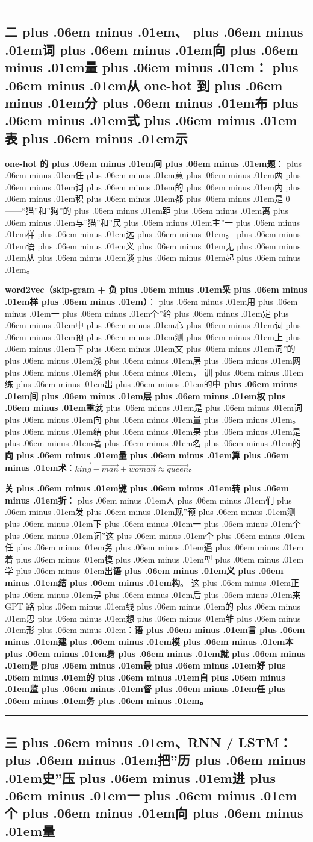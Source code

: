 \documentclass[
]{article}
\def\zh#1{{\zhfont #1}}
\def\zhglue{\hskip0pt plus .06em minus .01em}
\begin{document}
\begin{center}\rule{0.5\linewidth}{0.5pt}\end{center}

\subsection{\zh{二\zhglue 、\zhglue 词\zhglue 向\zhglue 量\zhglue ：\zhglue 从} one-hot \zh{到\zhglue 分\zhglue 布\zhglue 式\zhglue 表\zhglue 示}}\label{ux4e8cux8bcdux5411ux91cfux4ece-one-hot-ux5230ux5206ux5e03ux5f0fux8868ux793a}

\textbf{one-hot \zh{的\zhglue 问\zhglue 题}}\zh{：\zhglue 任\zhglue 意\zhglue 两\zhglue 词\zhglue 的\zhglue 内\zhglue 积\zhglue 都\zhglue 是} 0------``\zh{猫}''\zh{和}''\zh{狗}''\zh{的\zhglue 距\zhglue 离\zhglue 与}''\zh{猫}''\zh{和}''\zh{民\zhglue 主}''\zh{一\zhglue 样\zhglue 远\zhglue 。\zhglue 语\zhglue 义\zhglue 无\zhglue 从\zhglue 谈\zhglue 起\zhglue 。}

\textbf{word2vec\zh{（}skip-gram + \zh{负\zhglue 采\zhglue 样\zhglue ）}}\zh{：\zhglue 用\zhglue 一\zhglue 个}''\zh{给\zhglue 定\zhglue 中\zhglue 心\zhglue 词\zhglue 预\zhglue 测\zhglue 上\zhglue 下\zhglue 文\zhglue 词}''\zh{的\zhglue 浅\zhglue 层\zhglue 网\zhglue 络\zhglue ，} \zh{训\zhglue 练\zhglue 出\zhglue 的}\textbf{\zh{中\zhglue 间\zhglue 层\zhglue 权\zhglue 重}}\zh{就\zhglue 是\zhglue 词\zhglue 向\zhglue 量\zhglue 。\zhglue 结\zhglue 果\zhglue 是\zhglue 著\zhglue 名\zhglue 的}\textbf{\zh{向\zhglue 量\zhglue 算\zhglue 术}}\zh{：}\(\vec{king}-\vec{man}+\vec{woman}\approx\vec{queen}\)\zh{。}

\textbf{\zh{关\zhglue 键\zhglue 转\zhglue 折}}\zh{：\zhglue 人\zhglue 们\zhglue 发\zhglue 现}''\zh{预\zhglue 测\zhglue 下\zhglue 一\zhglue 个\zhglue 词}''\zh{这\zhglue 个\zhglue 任\zhglue 务\zhglue 逼\zhglue 着\zhglue 模\zhglue 型\zhglue 学\zhglue 出}\textbf{\zh{语\zhglue 义\zhglue 结\zhglue 构}}\zh{。} \zh{这\zhglue 正\zhglue 是\zhglue 后\zhglue 来} GPT \zh{路\zhglue 线\zhglue 的\zhglue 思\zhglue 想\zhglue 雏\zhglue 形\zhglue ：}\textbf{\zh{语\zhglue 言\zhglue 建\zhglue 模\zhglue 本\zhglue 身\zhglue 就\zhglue 是\zhglue 最\zhglue 好\zhglue 的\zhglue 自\zhglue 监\zhglue 督\zhglue 任\zhglue 务\zhglue 。}}

\begin{center}\rule{0.5\linewidth}{0.5pt}\end{center}

\subsection{\zh{三\zhglue 、}RNN / LSTM\zh{：\zhglue 把}''\zh{历\zhglue 史}''\zh{压\zhglue 进\zhglue 一\zhglue 个\zhglue 向\zhglue 量}}\label{ux4e09rnn-lstmux628aux5386ux53f2ux538bux8fdbux4e00ux4e2aux5411ux91cf}
\end{document}
